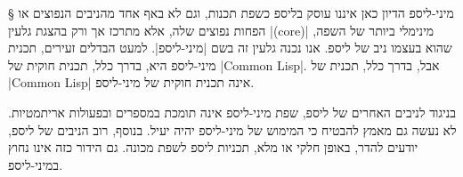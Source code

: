 %
%
%
%

§ מיני-ליספ
הדיון כאן איננו עוסק בליספ כשפת תכנות, וגם לא באף אחד מהניבים הנפוצים או הפחות
נפוצים שלה, אלא מתרכז אך ורק בהצגת גלעין \E|(core)| מינימלי ביותר של השפה, שהוא
בעצמו ניב של ליספ. אנו נכנה גלעין זה בשם \ע|מיני-ליספ|. למעט הבדלים זעירים,
תכנית מיני-ליספ היא, בדרך כלל, תכנית חוקית של \E|Common Lisp|. אבל, בדרך כלל,
תכנית של \E|Common Lisp| אינה תכנית חוקית של מיני-ליספ.

בניגוד לניבים האחרים של ליספ, שפת מיני-ליספ אינה תומכת במספרים ובפעולות
אריתמטיות. לא נעשה גם מאמץ להבטיח כי המימוש של מיני-ליספ יהיה יעיל. בנוסף, רוב
הניבים של ליספ, יודעים להדר, באופן חלקי או מלא, תכניות ליספ לשפת מכונה. גם
הידור כזה אינו נחוץ במיני-ליספ.

